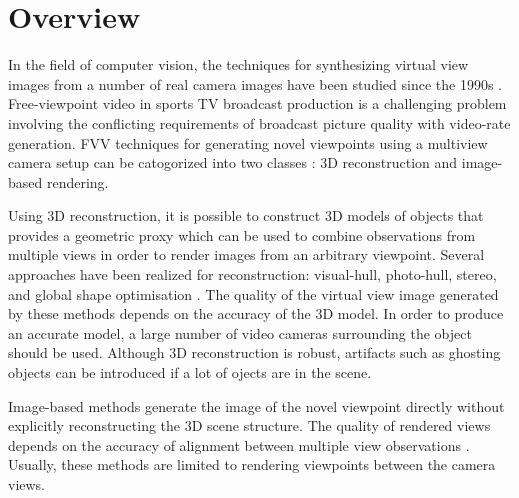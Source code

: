 
\section{Overview}
In the field of computer vision, the techniques for synthesizing virtual view images from a number of real camera
images have been studied since the 1990s \cite{b1,b2,b3}.
Free-viewpoint video in sports TV broadcast production is a challenging problem involving the conflicting requirements of 
broadcast picture quality with video-rate generation.
FVV techniques for generating novel viewpoints using a multiview camera setup can be catogorized into two classes 
\cite{05_plane_sweeping}: 3D reconstruction and image-based rendering. 

Using 3D reconstruction, it is possible to construct 3D models of objects that provides a geometric proxy which can be
used to combine observations from multiple views in order to render images from an arbitrary viewpoint. 
Several approaches have been realized for reconstruction: visual-hull, photo-hull, stereo, and 
global shape optimisation \cite{02_iview}.
The quality of the virtual view image generated
by these methods depends on the accuracy of the 3D model. In order to produce an accurate model, a
large number of video cameras surrounding the object should be used. 
Although 3D reconstruction is robust, artifacts such as ghosting objects can be introduced if a lot of ojects are in the scene. 

Image-based methods generate the image of the novel viewpoint directly without explicitly reconstructing the 3D scene structure.
The quality of rendered views depends on the accuracy of alignment between multiple view observations 
\cite{05_plane_sweeping,02_iview}.
Usually, these methods are limited to rendering viewpoints between the camera views.




